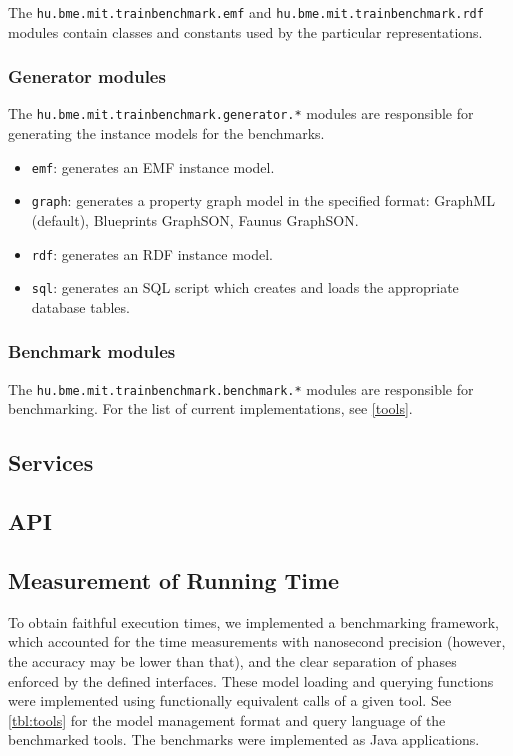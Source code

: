 The \texttt{hu.bme.mit.trainbenchmark.emf} and \texttt{hu.bme.mit.trainbenchmark.rdf} modules contain classes and constants used by the particular representations.



\subsubsection{Generator modules}

The \texttt{hu.bme.mit.trainbenchmark.generator.*} modules are responsible for generating the instance models for the benchmarks.

\begin{itemize}
  \item \texttt{emf}: generates an EMF instance model.
  \item \texttt{graph}: generates a property graph model in the specified format: GraphML (default), Blueprints GraphSON, Faunus GraphSON.
  \item \texttt{rdf}: generates an RDF instance model.
  \item \texttt{sql}: generates an SQL script which creates and loads the appropriate database tables.
\end{itemize}



\subsubsection{Benchmark modules}

The \texttt{hu.bme.mit.trainbenchmark.benchmark.*} modules are responsible for benchmarking. For the list of current implementations, see \autoref{tools}.


\subsection{Services}

\subsection{API}

\subsection{Measurement of Running Time}

To obtain faithful execution times, we implemented a benchmarking framework,
which accounted for the time measurements with nanosecond precision (however, the accuracy may be lower than that),
 and the clear separation of phases enforced by the defined
interfaces. These model loading and querying functions were implemented using
functionally equivalent calls of a given tool. See \autoref{tbl:tools} for
the model management format and query language of the benchmarked tools. The
benchmarks were implemented as Java applications.

